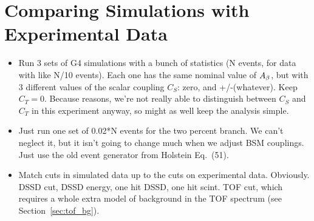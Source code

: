 \section{Comparing Simulations with Experimental Data}
\begin{itemize}
	\item Run 3 sets of G4 simulations with a bunch of statistics (N events, for data with like N/10 events).  Each one has the same nominal value of $A_{\beta}$, but with 3 different values of the scalar coupling $C_S$:  zero, and +/-(whatever).  Keep $C_T=0$.  Because reasons, we're not really able to distinguish between $C_S$ and $C_T$ in this experiment anyway, so might as well keep the analysis simple.
	\item Just run one set of 0.02*N events for the two percent branch.  We can't neglect it, but it isn't going to change much when we adjust BSM couplings.  Just use the old event generator from Holstein Eq.~(51).
	\item Match cuts in simulated data up to the cuts on experimental data.  Obviously.  DSSD cut, DSSD energy, one hit DSSD, one hit scint.  TOF cut, which requires a whole extra model of background in the TOF spectrum (see Section~\ref{sec:tof_bg}).

\end{itemize}

